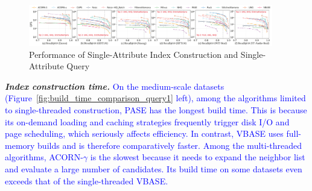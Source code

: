\documentclass[sigconf, nonacm]{acmart}
\begin{document}
{	
	\begin{figure}
		\centering
		\setlength{\abovecaptionskip}{0.1cm}
		\setlength{\belowcaptionskip}{-0.2cm}
		\includegraphics[width=0.95\textwidth]{figures/exp/exp_1_1_SingleLabel_1thread.pdf}
		\caption{Performance of Single-Attribute Index Construction and Single-Attribute Query }
		\label{fig:exp_1_1_SingleLabel_1thread}
	\end{figure}
	
%		
	
\textit{\textbf{Index construction time.}}
\textcolor{blue}{On the medium-scale datasets (Figure~\ref{fig:build_time_comparison_query1} left), among the algorithms limited to single-threaded construction, PASE has the longest build time. This is because its on-demand loading and caching strategies frequently trigger disk I/O and page scheduling, which seriously affects efficiency. In contrast, VBASE uses full-memory builds and is therefore comparatively faster. Among the multi-threaded algorithms, ACORN-$\gamma$ is the slowest because it needs to expand the neighbor list and evaluate a large number of candidates. Its build time on some datasets even exceeds that of the single-threaded VBASE. }

}
\end{document}
